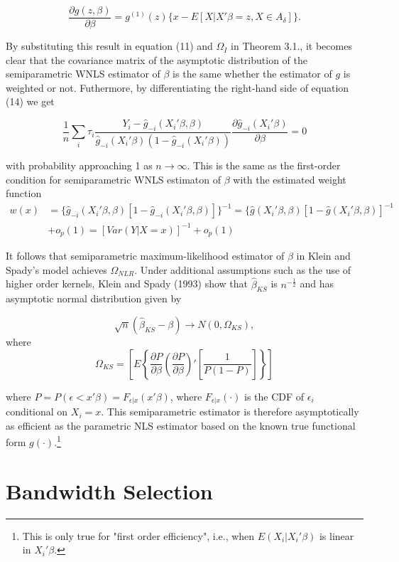 \documentclass[a4paper]{article}
\begin{document}
\[ \frac{\partial g(z,\beta)}{\partial \beta} = g^{(1)}(z)\{x - E[X|X'\beta = z, X \in A_{\delta}]\}.\]

By substituting this result in equation (11) and $\Omega_I$ in Theorem 3.1., it becomes clear that the covariance matrix of the asymptotic distribution of the semiparametric WNLS estimator of $\beta$ is the same whether the estimator of $g$ is weighted or not. Futhermore, by differentiating the right-hand side of equation (14) we get 

\[ \frac{1}{n} \sum_i \tau_{i} \frac{Y_i - \hat{g}_{-i}(X_i'\beta, \beta)}{\hat{g}_{-i}(X_i'\beta)(1 - \hat{g}_{-i}(X_i'\beta))} \frac{\partial\hat{g}_{-i}(X_i'\beta)}{\partial \beta} = 0 \]

with probability approaching 1 as $n \rightarrow \infty$. This is the same as the first-order condition for semiparametric WNLS estimaton of $\beta$ with the estimated weight function
\begin{align*}
w(x) & = \{ \hat{g}_{-i}(X_i'\beta, \beta)[ 1 - \hat{g}_{-i}(X_i'\beta, \beta)]\}^{-1} = \{ \hat{g}(X_i'\beta, \beta)[ 1 - \hat{g}(X_i'\beta, \beta)]^{-1} \\
	 & + o_p(1) = [Var(Y|X = x)]^{-1} + o_p(1)
\end{align*}

It follows that semiparametric maximum-likelihood estimator of $\beta$ in Klein and Spady's model achieves $\Omega_{NLR}$. 
Under additional assumptions such as the use of higher order kernels, Klein and Spady (1993) show that $\hat{\beta}_{KS}$ is $n^{-\frac{1}{2}}$ and has asymptotic normal distribution given by

\begin{equation}
\sqrt{n}(\hat{\beta}_{KS} - \beta) \rightarrow N(0,\Omega_{KS}),
\end{equation}
where \[ \Omega_{KS} = \left[ E \left\{ \frac{\partial P}{\partial \beta}\left(\frac{\partial P}{\partial \beta}\right)'\left[\frac{1}{P(1 - P)}\right]\right\}\right] \]

where $ P = P( \epsilon < x'\beta) = F_{\epsilon|x}(x'\beta)$, where $F_{\epsilon|x}(\cdot)$ is the CDF of $\epsilon_i$ conditional on $X_i = x$. This semiparametric estimator is therefore asymptotically as efficient as the parametric NLS estimator based on the known true functional form $g(\cdot)$.\footnote{This is only true for "first order efficiency", i.e., when $E(X_i|X_i'\beta)$ is linear in $X_i'\beta$.}

\section{Bandwidth Selection} %
\label{sec:Bandwidth Selection}


\newpage 


\end{document}
